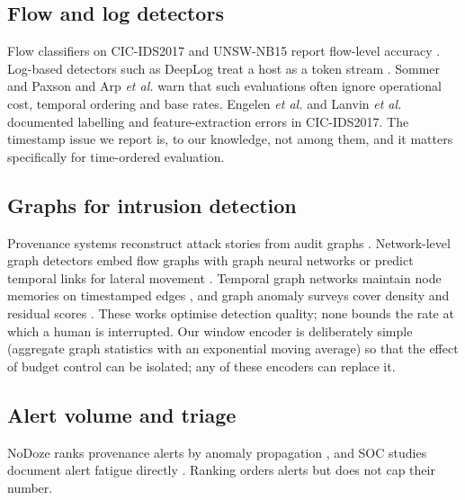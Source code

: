 \documentclass[journal,10pt,twocolumn]{IEEEtran}
\begin{document}
\subsection{Flow and log detectors}
Flow classifiers on CIC-IDS2017 and UNSW-NB15 report flow-level accuracy \cite{sharafaldin2018cicids,moustafa2015unsw,ring2019unsw}. Log-based detectors such as DeepLog treat a host as a token stream \cite{du2017deeplog,he2017drain,xu2009lsa}. Sommer and Paxson \cite{sommer2010closed} and Arp \emph{et al.} \cite{arp2022dos} warn that such evaluations often ignore operational cost, temporal ordering and base rates. Engelen \emph{et al.} \cite{engelen2021troubleshooting} and Lanvin \emph{et al.} \cite{lanvin2023errors} documented labelling and feature-extraction errors in CIC-IDS2017. The timestamp issue we report is, to our knowledge, not among them, and it matters specifically for time-ordered evaluation.

\subsection{Graphs for intrusion detection}
Provenance systems reconstruct attack stories from audit graphs \cite{king2003backtracking,hossain2017sleuth,milajerdi2019holmes,cheng2024kairos,rehman2024flash}. Network-level graph detectors embed flow graphs with graph neural networks \cite{lo2022egraphsage,hamilton2017graphsage,kipf2017gcn} or predict temporal links for lateral movement \cite{king2022euler}. Temporal graph networks maintain node memories on timestamped edges \cite{rossi2020tgn,kumar2019jodie,pareja2020evolvegcn}, and graph anomaly surveys cover density and residual scores \cite{akoglu2015graph}. These works optimise detection quality; none bounds the rate at which a human is interrupted. Our window encoder is deliberately simple (aggregate graph statistics with an exponential moving average) so that the effect of budget control can be isolated; any of these encoders can replace it.

\subsection{Alert volume and triage}
NoDoze ranks provenance alerts by anomaly propagation \cite{hassan2019nodoze}, and SOC studies document alert fatigue directly \cite{alahmadi2022falsepos,kokulu2019soc}. Ranking orders alerts but does not cap their number.
\end{document}
